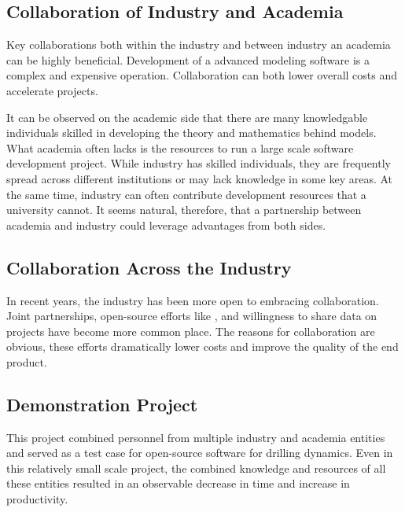 \subsection{Collaboration of Industry and Academia}
Key collaborations both within the industry and between industry an academia can be highly beneficial.  Development of a advanced modeling software is a complex and expensive operation.  Collaboration can both lower overall costs and accelerate projects.

It can be observed on the academic side that there are many knowledgable individuals skilled in developing the theory and mathematics behind models.  What academia often lacks is the resources to run a large scale software development project.  While industry has skilled individuals, they are frequently spread across different institutions or may lack knowledge in some key areas.  At the same time, industry can often contribute development resources that a university cannot.  It seems natural, therefore, that a partnership between academia and industry could leverage advantages from both sides.



\subsection{Collaboration Across the Industry}
In recent years, the industry has been more open to embracing collaboration.  Joint partnerships, open-source efforts like \osdu{}, and willingness to share data on projects have become more common place.  The reasons for collaboration are obvious, these efforts dramatically lower costs and improve the quality of the end product.

\subsection{Demonstration Project}


This project combined personnel from multiple industry and academia entities and served as a test case for open-source software for drilling dynamics.  Even in this relatively small scale project, the combined knowledge and resources of all these entities resulted in an observable decrease in time and increase in productivity.



